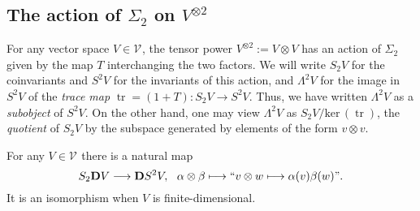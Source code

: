 \documentclass[11pt]{amsart} \renewcommand{\baselinestretch}{1.4}
\theoremstyle{plain}
\theoremstyle{definition}
\renewcommand{\ker}{\mathrm{ker}\,}
\DeclareMathOperator{\trace}{tr}
\renewcommand{\to}{\longrightarrow}
\newcommand{\calV}{\mathcal{V}}
\newcommand{\vect}[2]{\calV^{#1}_{#2}}
\newcommand{\dual}{\mathbf{D}}
\renewcommand{\mapsto}{\longmapsto}
\begin{document}
\begin{Conventions and notation}
\subsection{The action of $\Sigma_2$ on $V^{\otimes 2}$}
For any vector space $V\in \vect{}{}$, the tensor power $V^{\otimes2}:=V\otimes V$ has an action of $\Sigma_2$ given by the map $T$ interchanging the two factors. We will write $S_2V$ for the coinvariants and $S^2V$ for the invariants of this action, and $\Lambda^2V$ for the image in $S^2V$ of the \emph{trace map} $\trace=(1+T):S_2V\to S^2V$. Thus, we have written $\Lambda^2V$ as a \emph{subobject} of $S^2V$.
On the other hand, one may view $\Lambda^2V$ as $S_2V/\ker(\trace)$,  the \emph{quotient} of $S_2V$ by the subspace generated by elements of the form $v\otimes v$. %

For any $V\in \vect{}{}$ there is a natural map
\[S_2\dual V\to \dual S^2V,\ \ \alpha\otimes \beta\mapsto\textup{``$v\otimes w\mapsto \alpha(v)\beta(w)$''}.\]
It is an isomorphism when $V$ is finite-dimensional.


\end{Conventions and notation}
\end{document}

